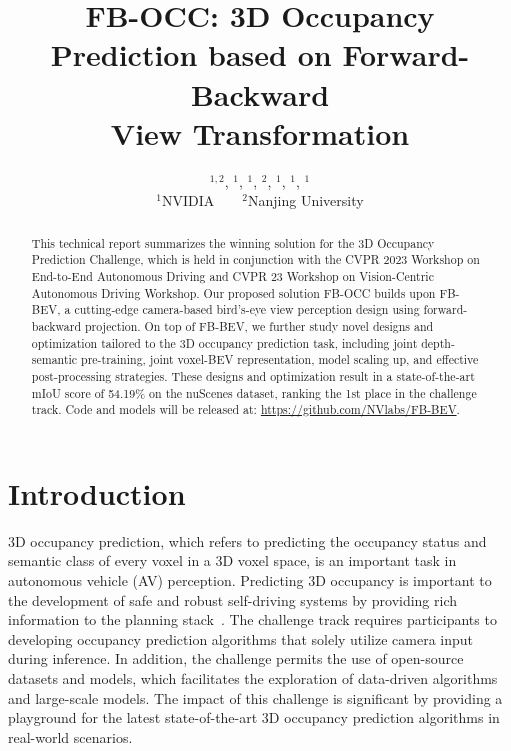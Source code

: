 \documentclass[10pt,twocolumn,letterpaper]{article}
\begin{document}
\title{FB-OCC: 3D Occupancy Prediction based on Forward-Backward\\View Transformation
}

\author{
$^{1,2}$,
$^{1}$,
$^{1}$,
$^{2}$,
$^{1}$,
$^{1}$,
$^{1}$
\\ [0.15cm]
$^1$NVIDIA~~~~$^2$Nanjing University
}
\maketitle
\newcommand\blfootnote[1]{\begingroup
  \renewcommand\thefootnote{}\footnote{#1}\addtocounter{footnote}{-1}\endgroup
}






\begin{abstract}
This technical report summarizes the winning solution for the 3D Occupancy Prediction Challenge, which is held in conjunction with the CVPR 2023 Workshop on End-to-End Autonomous Driving and CVPR 23 Workshop on Vision-Centric Autonomous Driving Workshop. Our proposed solution FB-OCC builds upon FB-BEV, a cutting-edge camera-based bird's-eye view perception design using forward-backward projection. On top of FB-BEV, we further study novel designs and optimization tailored to the 3D occupancy prediction task, including joint depth-semantic pre-training, joint voxel-BEV representation, model scaling up, and effective post-processing strategies. These designs and optimization result in a state-of-the-art mIoU score of 54.19\% on the nuScenes dataset, ranking the 1st place in the challenge track. Code and models will be released at: \url{https://github.com/NVlabs/FB-BEV}.
\vspace{-5mm}
\end{abstract}

\section{Introduction}
3D occupancy prediction, which refers to predicting the occupancy status and semantic class of every voxel in a 3D voxel space, is an important task in autonomous vehicle (AV) perception. Predicting 3D occupancy is important to the development of safe and robust self-driving systems by providing rich information to the planning stack~\cite{hu2023planning}. The challenge track requires participants to developing occupancy prediction algorithms that solely utilize camera input during inference. In addition, the challenge permits the use of open-source datasets and models, which facilitates the exploration of data-driven algorithms and large-scale models. The impact of this challenge is significant by providing a playground for the latest state-of-the-art 3D occupancy prediction algorithms in real-world scenarios.
\end{document}
